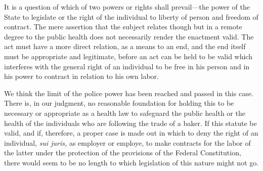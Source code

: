 \documentclass[
  letterpaper,
  11pt,
  DIV=9,
  openright]{scrbook}
\begin{document}
It is a question of which of two powers or rights shall prevail---the
power of the State to legislate or the right of the individual to
liberty of person and freedom of contract. The mere assertion that the
subject relates though but in a remote degree to the public health does
not necessarily render the enactment valid. The act must have a more
direct relation, as a means to an end, and the end itself must be
appropriate and legitimate, before an act can be held to be valid which
interferes with the general right of an individual to be free in his
person and in his power to contract in relation to his own labor.

We think the limit of the police power has been reached and passed in
this case. There is, in our judgment, no reasonable foundation for
holding this to be necessary or appropriate as a health law to safeguard
the public health or the health of the individuals who are following the
trade of a baker. If this statute be valid, and if, therefore, a proper
case is made out in which to deny the right of an individual, \emph{sui
juris,} as employer or employe, to make contracts for the labor of the
latter under the protection of the provisions of the Federal
Constitution, there would seem to be no length to which legislation of
this nature might not go.
\end{document}
